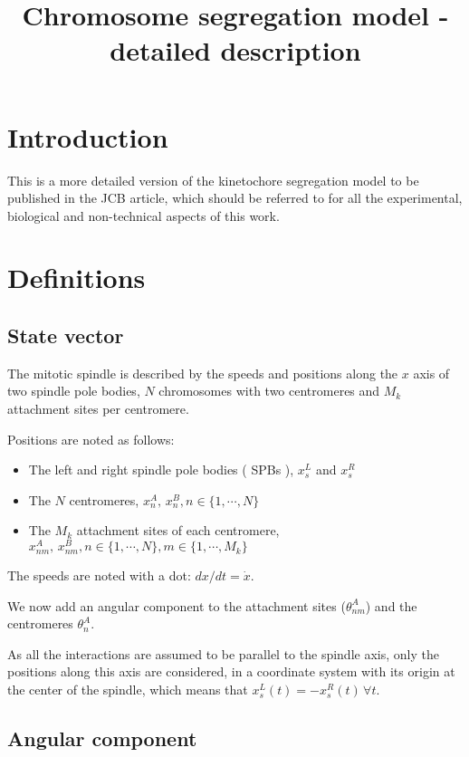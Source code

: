 \documentclass[a4paper,12pt]{article}
\title{Chromosome segregation model - detailed description}
\date{}
\begin{document}


\maketitle{}


\section*{Introduction}

This is a more detailed version of the kinetochore segregation model
to be published in the JCB article, which should be referred to for
all the experimental, biological and non-technical aspects of this
work.


\section{Definitions}
\label{sec:defs}

\subsection{State vector}

The mitotic spindle is described by the speeds and positions along the
$x$ axis of two spindle pole bodies, $N$ chromosomes with two
centromeres and $M_k$ attachment sites per centromere.

Positions are noted as follows:
\begin{itemize}
\item The left and right spindle pole bodies ( SPBs ), $x_s^L$ and $x_s^R$
\item The $N$ centromeres, $x_n^A, \, x_n^B, n \in \{1,\cdots, N\}$
\item The $M_k$ attachment sites of each centromere, $x_{nm}^A, \,
  x_{nm}^B, n \in \{1, \cdots, N \}, m \in \{1, \cdots, M_k\}$
\end{itemize}
The speeds are noted with a dot: $dx / dt = \dot{x}$.

We now add an angular component to the attachment sites ($\theta_{nm}^A$) and the
centromeres $\theta_n^A$.

As all the interactions are assumed to be parallel to the spindle
axis, only the positions along this axis are considered, in a coordinate
system with its origin at the center of the spindle, which means that
$x_s^L(t) = - x_s^R(t)\, \forall t$.

\subsection{Angular component}
\end{document}
